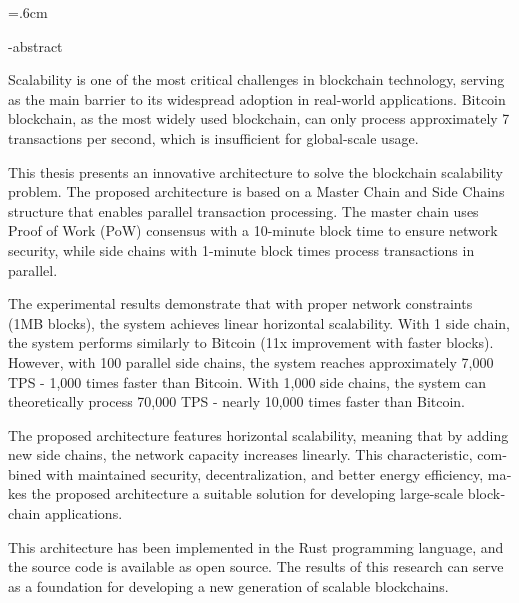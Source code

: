 
\baselineskip=.6cm
\begin{latin}
\secondlatinsupervisor{}
\firstlatinadvisor{}
\en-abstract{
Scalability is one of the most critical challenges in blockchain technology, serving as the main barrier to its widespread adoption in real-world applications. Bitcoin blockchain, as the most widely used blockchain, can only process approximately 7 transactions per second, which is insufficient for global-scale usage.

This thesis presents an innovative architecture to solve the blockchain scalability problem. The proposed architecture is based on a Master Chain and Side Chains structure that enables parallel transaction processing. The master chain uses Proof of Work (PoW) consensus with a 10-minute block time to ensure network security, while side chains with 1-minute block times process transactions in parallel.

The experimental results demonstrate that with proper network constraints (1MB blocks), the system achieves linear horizontal scalability. With 1 side chain, the system performs similarly to Bitcoin (11x improvement with faster blocks). However, with 100 parallel side chains, the system reaches approximately 7,000 TPS - 1,000 times faster than Bitcoin. With 1,000 side chains, the system can theoretically process 70,000 TPS - nearly 10,000 times faster than Bitcoin.

The proposed architecture features horizontal scalability, meaning that by adding new side chains, the network capacity increases linearly. This characteristic, combined with maintained security, decentralization, and better energy efficiency, makes the proposed architecture a suitable solution for developing large-scale blockchain applications.

This architecture has been implemented in the Rust programming language, and the source code is available as open source. The results of this research can serve as a foundation for developing a new generation of scalable blockchains.
}
\latinTitlePage
\end{latin}
